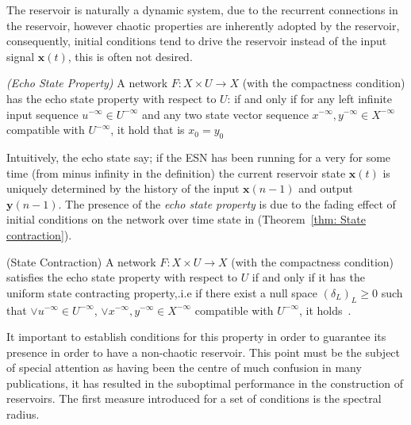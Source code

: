 \documentclass{WitsPhysicsReport}
\begin{document}
The reservoir is naturally a dynamic system, due to the recurrent connections in the reservoir, however chaotic properties are inherently adopted by the reservoir, consequently, initial conditions tend to drive the reservoir instead of the input signal $\mathbf{x}(t) $, this is often not desired.

\begin{definition}
\emph{(Echo State Property)}
A network $F: X \times U \rightarrow X $ (with the compactness condition) has the echo state property with respect to $U$: if and only if for any left infinite input sequence $u^{-\infty} \in U^{-\infty}$ and any two state vector sequence $x^{-\infty},y^{-\infty} \in X^{-\infty}$ compatible with $U^{-\infty}$, it hold that is $x_{0} = y_{0}$~\cite{jaeger2001echo}
\label{def: Echo_State_Property}
\end{definition}

\par {Intuitively, the echo state say; if the ESN has been running for a very for some time (from minus infinity in the definition) the current reservoir state $\mathbf{x}(t)$ is uniquely determined by the history of the input $\mathbf{x}(n-1)$ and output $\mathbf{y}(n-1)$. The presence of the \textit{echo state property} is due to the fading effect of initial conditions on the network over time state in  (Theorem~\ref{thm: State contraction}).}

\begin{theorem}{(State Contraction)}
A network $F: X \times U \rightarrow X $ (with the compactness condition) satisfies the echo state property with respect to $U$ if and only if it has the uniform state contracting property,.i.e if there exist a null space $(\delta_{L})_{L} \geq 0 $ such that $\vee u^{-\infty} \in U^{-\infty}$, $ \vee x^{-\infty},y^{-\infty} \in X^{-\infty}$ compatible with $U^{-\infty}$, it holds~\cite{lukovsevivcius2009reservoir}. 
\label{thm: State contraction}
\end{theorem}




It important to establish conditions for this property in order to guarantee its presence in order to have a non-chaotic reservoir. This point must be the subject of special attention as having been the centre of much confusion in many publications, it has resulted in the suboptimal performance in the construction of reservoirs. The first measure introduced for a set of conditions is the spectral radius.
\end{document}
